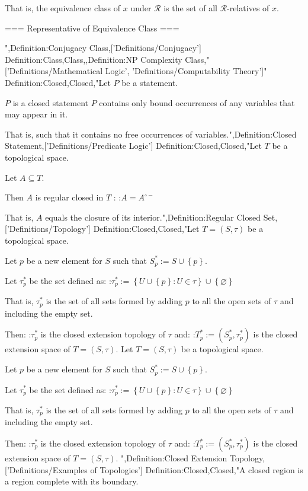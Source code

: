 That is, the equivalence class of $x$ under $\mathcal R$ is the set of all $\mathcal R$-relatives of $x$.


=== Representative of Equivalence Class ===

",Definition:Conjugacy Class,['Definitions/Conjugacy']
Definition:Class,Class,,Definition:NP Complexity Class,"['Definitions/Mathematical Logic', 'Definitions/Computability Theory']"
Definition:Closed,Closed,"Let $P$ be a statement.

$P$ is a closed statement  $P$ contains only bound occurrences of any variables that may appear in it.


That is, such that it contains no free occurrences of variables.",Definition:Closed Statement,['Definitions/Predicate Logic']
Definition:Closed,Closed,"Let $T$ be a topological space.

Let $A \subseteq T$.


Then $A$ is regular closed in $T$ :
:$A = A^{\circ -}$

That is,  $A$ equals the closure of its interior.",Definition:Regular Closed Set,['Definitions/Topology']
Definition:Closed,Closed,"Let $T = \left( S, \tau \right)$ be a topological space.

Let $p$ be a new element for $S$ such that $S^*_p := S \cup \left\lbrace p \right\rbrace$.


Let $\tau^*_p$ be the set defined as:
:$\tau^*_p := \left\lbrace U \cup \left\lbrace p \right\rbrace: U \in \tau \right\rbrace \cup \left\lbrace \varnothing \right\rbrace$

That is, $\tau^*_p$ is the set of all sets formed by adding $p$ to all the open sets of $\tau$ and including the empty set.


Then:
:$\tau^*_p$ is the closed extension topology of $\tau$
and:
:$T^*_p := \left( S^*_p, \tau^*_p \right)$ is the closed extension space of $T = \left( S, \tau \right)$.
Let $T = \left( S, \tau \right)$ be a topological space.

Let $p$ be a new element for $S$ such that $S^*_p := S \cup \left\lbrace p \right\rbrace$.


Let $\tau^*_p$ be the set defined as:
:$\tau^*_p := \left\lbrace U \cup \left\lbrace p \right\rbrace: U \in \tau \right\rbrace \cup \left\lbrace \varnothing \right\rbrace$

That is, $\tau^*_p$ is the set of all sets formed by adding $p$ to all the open sets of $\tau$ and including the empty set.


Then:
:$\tau^*_p$ is the closed extension topology of $\tau$
and:
:$T^*_p := \left( S^*_p, \tau^*_p \right)$ is the closed extension space of $T = \left( S, \tau \right)$.
",Definition:Closed Extension Topology,['Definitions/Examples of Topologies']
Definition:Closed,Closed,"A closed region is a region complete with its boundary.


